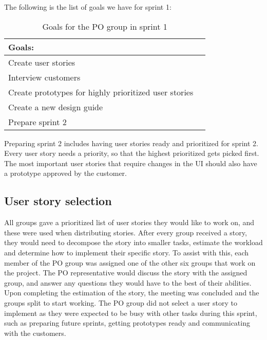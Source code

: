 \noindent
The following is the list of goals we have for sprint 1:
\begin{table}[H]
    \centering
    \begin{tabular}{|l|l|}
    \hline
    Goals:                                \\ \hline
    Create user stories                   \\ \hline
    Interview customers                    \\ \hline
    Create prototypes for highly prioritized user stories \\ \hline
    Create a new design guide                \\ \hline
    Prepare sprint 2                       \\ \hline
    \end{tabular}
    \caption{Goals for the PO group in sprint 1}
    \label{PO-goal-sprint-1}
\end{table}
\noindent
Preparing sprint 2 includes having user stories ready and prioritized for sprint 2.
Every user story needs a priority, so that the highest prioritized gets picked first.
The most important user stories that require changes in the UI should also have a prototype approved by the customer.

\subsection{User story selection}
All groups gave a prioritized list of user stories they would like to work on, and these were used when distributing stories.
After every group received a story, they would need to decompose the story into smaller tasks, estimate the workload and determine how to implement their specific story.
To assist with this, each member of the PO group was assigned one of the other six groups that work on the project. 
The PO representative would discuss the story with the assigned group, and answer any questions they would have to the best of their abilities.
Upon completing the estimation of the story, the meeting was concluded and the groups split to start working.
The PO group did not select a user story to implement as they were expected to be busy with other tasks during this sprint, such as preparing future sprints, getting prototypes ready and communicating with the customers.
